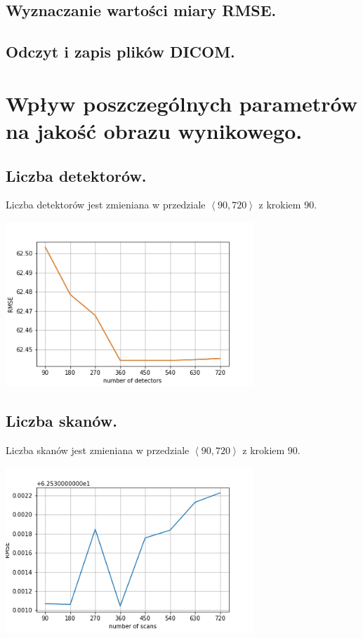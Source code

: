 \documentclass[a4paper, 11pt]{article}
\begin{document}
	\subsection{Wyznaczanie wartości miary RMSE.}
	\subsection{Odczyt i zapis plików DICOM.}
	
	\section{Wpływ poszczególnych parametrów na jakość obrazu wynikowego.}
	\subsection{Liczba detektorów.}
	
	Liczba detektorów jest zmieniana w przedziale $\left<90, 720 \right>$ z krokiem $90$.
	
	\begin{center}
		\includegraphics[width=0.7\textwidth]{detectors.png}
	\end{center}
	\subsection{Liczba skanów.}
	
	Liczba skanów jest zmieniana w przedziale $\left<90, 720 \right>$ z krokiem $90$.
	
	\begin{center}
		\includegraphics[width=0.7\textwidth]{scans.png}
	\end{center}
\end{document}
